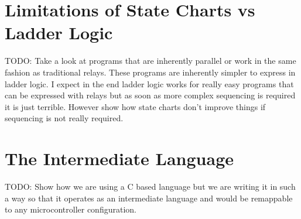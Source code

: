 \section{Limitations of State Charts vs Ladder Logic}
TODO: Take a look at programs that are inherently parallel or work in the same fashion as traditional relays. These programs are inherently simpler to express in ladder logic. I expect in the end ladder logic works for really easy programs that can be expressed with relays but as soon as more complex sequencing is required it is just terrible. However show how state charts don't improve things if sequencing is not really required.
\section{The Intermediate Language}
TODO: Show how we are using a C based language but we are writing it in such a way so that it operates as an intermediate language and would be remappable to any microcontroller configuration.